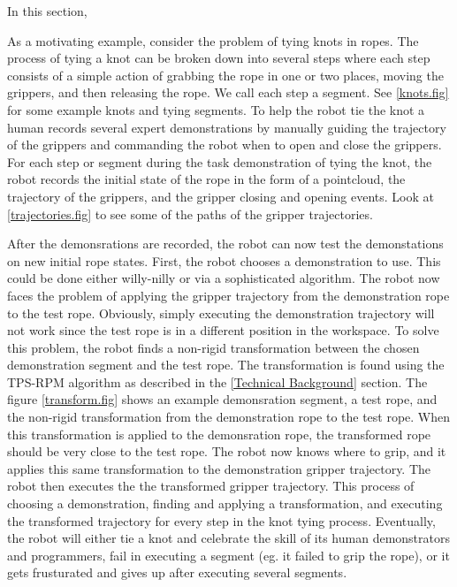 In this section,

As a motivating example, consider the problem of tying knots in ropes. The process of tying a knot can be broken down into several steps where each step consists of a simple action of grabbing the rope in one or two places, moving the grippers, and then releasing the rope. We call each step a segment. See \ref{knots.fig} for some example knots and tying segments. To help the robot tie the knot a human records several expert demonstrations by manually guiding the trajectory of the grippers and commanding the robot when to open and close the grippers. For each step or segment during the task demonstration of tying the knot, the robot records the initial state of the rope in the form of a pointcloud, the trajectory of the grippers, and the gripper closing and opening events. Look at \ref{trajectories.fig} to see some of the paths of the gripper trajectories.

After the demonsrations are recorded, the robot can now test the demonstations on new initial rope states. First, the robot chooses a demonstration to use. This could be done either willy-nilly or via a sophisticated algorithm. The robot now faces the problem of applying the gripper trajectory from the demonstration rope to the test rope. Obviously, simply executing the demonstration trajectory will not work since the test rope is in a different position in the workspace. To solve this problem, the robot finds a non-rigid transformation between the chosen demonstration segment and the test rope. The transformation is found using the TPS-RPM algorithm as described in the \ref{Technical Background} section. The figure \ref{transform.fig} shows an example demonsration segment, a test rope, and the non-rigid transformation from the demonstration rope to the test rope. When this transformation is applied to the demonsration rope, the transformed rope should be very close to the test rope. The robot now knows where to grip, and it applies this same transformation to the demonstration gripper trajectory. The robot then executes the the transformed gripper trajectory. This process of choosing a demonstration, finding and applying a transformation, and executing the transformed trajectory for every step in the knot tying process. Eventually, the robot will either tie a knot and celebrate the skill of its human demonstrators and programmers, fail in executing a segment (eg. it failed to grip the rope), or it gets frusturated and gives up after executing several segments.
